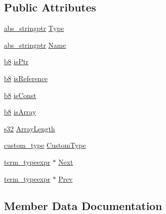 \subsection*{Public Attributes}
\begin{DoxyCompactItemize}
\item 
\hyperlink{structabs__stringptr}{abs\+\_\+stringptr} \hyperlink{structterm__typeexpr_ae05c0a936f42e129b697dc57ae803e0e}{Type}
\item 
\hyperlink{structabs__stringptr}{abs\+\_\+stringptr} \hyperlink{structterm__typeexpr_ace41bcc5404c7493366b27409acdf50c}{Name}
\item 
\hyperlink{ab__common_8h_a70e369648385b50f2d0588e8e8745275}{b8} \hyperlink{structterm__typeexpr_a93ac336807d6f45f5bd6270f21b02679}{is\+Ptr}
\item 
\hyperlink{ab__common_8h_a70e369648385b50f2d0588e8e8745275}{b8} \hyperlink{structterm__typeexpr_aa8779ec62ac26dd1239060953fd65f56}{is\+Reference}
\item 
\hyperlink{ab__common_8h_a70e369648385b50f2d0588e8e8745275}{b8} \hyperlink{structterm__typeexpr_af67982c68088bdca49bdcd1738bb7b7a}{is\+Const}
\item 
\hyperlink{ab__common_8h_a70e369648385b50f2d0588e8e8745275}{b8} \hyperlink{structterm__typeexpr_a2bc07d643069855d995bbcd4fa81006c}{is\+Array}
\item 
\hyperlink{ab__common_8h_ae9b1af5c037e57a98884758875d3a7c4}{s32} \hyperlink{structterm__typeexpr_ab93773f58c02499d82f1dd1188182506}{Array\+Length}
\item 
\hyperlink{ab__parser_8h_ac9039717ce4cccacf493ee306650a423}{custom\+\_\+type} \hyperlink{structterm__typeexpr_a9544ece5f851486a3a725c0bd87df73f}{Custom\+Type}
\item 
\hyperlink{structterm__typeexpr}{term\+\_\+typeexpr} $\ast$ \hyperlink{structterm__typeexpr_a827f986754feb8a31cb88bb5929f35cb}{Next}
\item 
\hyperlink{structterm__typeexpr}{term\+\_\+typeexpr} $\ast$ \hyperlink{structterm__typeexpr_ac489d3375eb8507325fd21d328bdf2cc}{Prev}
\end{DoxyCompactItemize}


\subsection{Member Data Documentation}
\mbox{\label{structterm__typeexpr_ab93773f58c02499d82f1dd1188182506}} 
